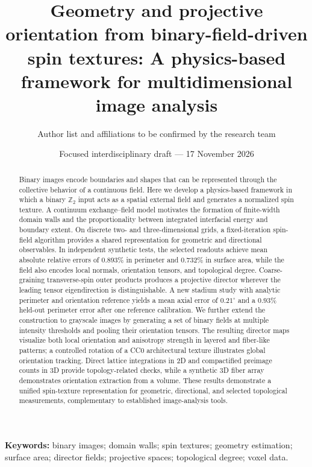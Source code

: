 \documentclass[11pt,a4paper]{article}
\title{Geometry and projective orientation from binary-field-driven spin textures: A physics-based framework for multidimensional image analysis}
\author{Author list and affiliations to be confirmed by the research team}
\date{Focused interdisciplinary draft --- 17 November 2026}
\begin{document}
\maketitle

\begin{abstract}
Binary images encode boundaries and shapes that can be represented through the collective behavior of a continuous field. Here we develop a physics-based framework in which a binary $\mathbb Z_2$ input acts as a spatial external field and generates a normalized spin texture. A continuum exchange--field model motivates the formation of finite-width domain walls and the proportionality between integrated interfacial energy and boundary extent. On discrete two- and three-dimensional grids, a fixed-iteration spin-field algorithm provides a shared representation for geometric and directional observables. In independent synthetic tests, the selected readouts achieve mean absolute relative errors of $0.893\%$ in perimeter and $0.732\%$ in surface area, while the field also encodes local normals, orientation tensors, and topological degree. Coarse-graining transverse-spin outer products produces a projective director wherever the leading tensor eigendirection is distinguishable. A new stadium study with analytic perimeter and orientation reference yields a mean axial error of $0.21^\circ$ and a $0.93\%$ held-out perimeter error after one reference calibration. We further extend the construction to grayscale images by generating a set of binary fields at multiple intensity thresholds and pooling their orientation tensors. The resulting director maps visualize both local orientation and anisotropy strength in layered and fiber-like patterns; a controlled rotation of a CC0 architectural texture illustrates global orientation tracking. Direct lattice integrations in 2D and compactified preimage counts in 3D provide topology-related checks, while a synthetic 3D fiber array demonstrates orientation extraction from a volume. These results demonstrate a unified spin-texture representation for geometric, directional, and selected topological measurements, complementary to established image-analysis tools.
\end{abstract}

\noindent\textbf{Keywords:} binary images; domain walls; spin textures; geometry estimation; surface area; director fields; projective spaces; topological degree; voxel data.
\end{document}
